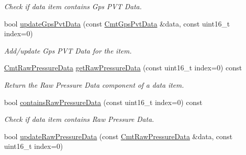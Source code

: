 \begin{DoxyCompactItemize}
\begin{DoxyCompactList}\small\item\em \-Check if data item contains \-Gps \-P\-V\-T \-Data. \end{DoxyCompactList}\item 
\hypertarget{classxsens_1_1Packet_a24ebaf0b710bc0c6a95db135b56e2813}{bool \hyperlink{classxsens_1_1Packet_a24ebaf0b710bc0c6a95db135b56e2813}{update\-Gps\-Pvt\-Data} (const \hyperlink{structCmtGpsPvtData}{\-Cmt\-Gps\-Pvt\-Data} \&data, const uint16\-\_\-t index=0)}\label{classxsens_1_1Packet_a24ebaf0b710bc0c6a95db135b56e2813}

\begin{DoxyCompactList}\small\item\em \-Add/update \-Gps \-P\-V\-T \-Data for the item. \end{DoxyCompactList}\item 
\hyperlink{structCmtRawPressureData}{\-Cmt\-Raw\-Pressure\-Data} \hyperlink{classxsens_1_1Packet_a5adb975df1d4fc65573fdc66b6a84ad2}{get\-Raw\-Pressure\-Data} (const uint16\-\_\-t index=0) const 
\begin{DoxyCompactList}\small\item\em \-Return the \-Raw \-Pressure \-Data component of a data item. \end{DoxyCompactList}\item 
\hypertarget{classxsens_1_1Packet_af5d9428f23e406fdbbd138e0e72d4ba5}{bool \hyperlink{classxsens_1_1Packet_af5d9428f23e406fdbbd138e0e72d4ba5}{contains\-Raw\-Pressure\-Data} (const uint16\-\_\-t index=0) const }\label{classxsens_1_1Packet_af5d9428f23e406fdbbd138e0e72d4ba5}

\begin{DoxyCompactList}\small\item\em \-Check if data item contains \-Raw \-Pressure \-Data. \end{DoxyCompactList}\item 
\hypertarget{classxsens_1_1Packet_a7e410c892e093e3c04040672510d3e41}{bool \hyperlink{classxsens_1_1Packet_a7e410c892e093e3c04040672510d3e41}{update\-Raw\-Pressure\-Data} (const \hyperlink{structCmtRawPressureData}{\-Cmt\-Raw\-Pressure\-Data} \&data, const uint16\-\_\-t index=0)}\label{classxsens_1_1Packet_a7e410c892e093e3c04040672510d3e41}


\end{DoxyCompactItemize}
